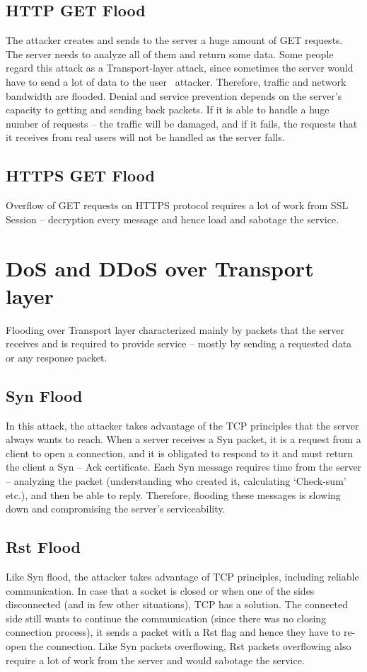 \documentclass{report}
\begin{document}
\subsection {HTTP GET Flood} The attacker creates and sends to the server a huge amount of GET requests. The server needs to analyze all of them and return some data. Some people regard this attack as a Transport-layer attack, since sometimes the server would have to send a lot of data to the user \ attacker. Therefore, traffic and network bandwidth are flooded. Denial and service prevention depends on the server’s capacity to getting and sending back packets. If it is able to handle a huge number of requests – the traffic will be damaged, and if it fails, the requests that it receives from real users will not be handled as the server falls.

\subsection{HTTPS GET Flood} Overflow of GET requests on HTTPS protocol requires a lot of work from SSL Session – decryption every message and hence load and sabotage the service.
\hfill \break
\section {DoS and DDoS over Transport layer} 

 \hfill \break Flooding over Transport layer characterized mainly by packets that the server receives and is required to provide service – mostly by sending a requested data or any response packet.

 \subsection{Syn Flood} In this attack, the attacker takes advantage of the TCP principles that the server always wants to reach. When a server receives a Syn packet, it is a request from a client to open a connection, and it is obligated to respond to it and must return the client a Syn – Ack certificate. Each Syn message requires time from the server – analyzing the packet (understanding who created it, calculating ‘Check-sum’ etc.), and then be able to reply. Therefore, flooding these messages is slowing down and compromising the server’s serviceability.

\subsection{Rst Flood} Like Syn flood, the attacker takes advantage of TCP principles, including reliable communication. In case that a socket is closed or when one of the sides disconnected (and in few other situations), TCP has a solution. The connected side still wants to continue the communication (since there was no closing connection process), it sends a packet with a Rst flag and hence they have to re-open the connection. Like Syn packets overflowing, Rst packets overflowing also require a lot of work from the server and would sabotage the service.
\end{document}
